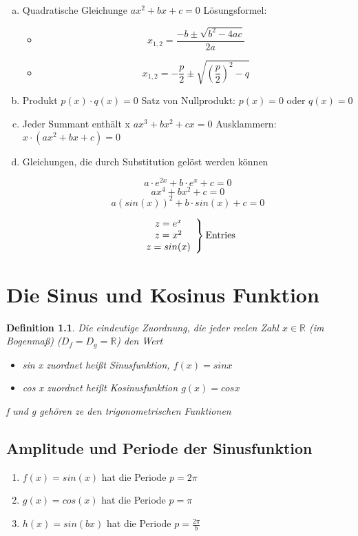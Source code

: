 \documentclass{book}
\newtheorem{definition}{Definition}
\begin{document}
\begin{enumerate}[a)]
    \item Quadratische Gleichunge $ax^2+bx+c=0$ 
        Lösungsformel: 
        \begin{itemize}
            \item \[x_{1, 2} = \frac{-b\pm\sqrt{b^2-4ac}}{2a}\]
            \item \[x_{1, 2} = -\frac p 2 \pm \sqrt{(\frac p 2 )^2-q}\]
        \end{itemize}
    \item Produkt $ p(x) \cdot q(x) = 0$ 
        Satz von Nullprodukt: $ p(x) = 0$ oder $q(x) = 0$
    \item Jeder Summant enthält x $ ax^3 + bx^2+cx = 0$
        Ausklammern: $ x\cdot (ax^2+bx+c)=0$
    \item Gleichungen, die durch Substitution gelöst werden können 
        \begin{multicols}{2}
            \[ a\cdot e^{2x} +b \cdot e^x +c = 0\]
            \[ax^4 + bx^2 +c = 0\]
            \[a(sin(x))^2 + b\cdot sin(x) + c = 0\]

            \columnbreak
            \begin{equation*}
                \begin{rcases}
                    \begin{array}{c}
                        z=e^x \\
                        z = x^2 \\
                        z = sin(x)
                    \end{array} 
                \end{rcases}
                \text{Entries}
            \end{equation*}
        \end{multicols}

\end{enumerate}

\chapter {Die Sinus und Kosinus Funktion}

\begin{definition}
    Die eindeutige Zuordnung, die jeder reelen Zahl $x\in\mathbb{R}$ (im Bogenmaß) ($D_f = D_g = \mathbb{R}$) den Wert
    \begin{itemize}
        \item sin x zuordnet heißt Sinusfunktion, $f(x)=sin x$
        \item cos x zuordnet heißt Kosinusfunktion $g(x) = cos x$
    \end{itemize}
    f und g gehören ze den trigonometrischen Funktionen
\end{definition}

\section{Amplitude und Periode der Sinusfunktion}
\begin{enumerate}
    \item $f(x) = sin (x)$ hat die Periode $p = 2 \pi$
    \item $g(x) = cos (x)$ hat die Periode $p = \pi$
    \item $h(x) = sin (bx)$ hat die Periode $p = \frac {2\pi}b$
\end{enumerate}
\end{document}
